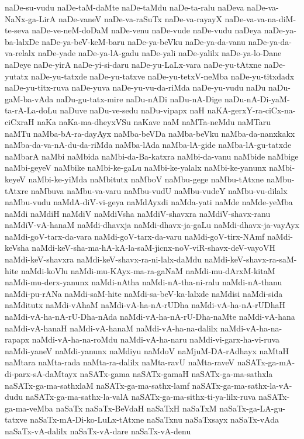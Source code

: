 {naDe-su-vudu
naDe-taM-daMte
naDe-taMdu
naDe-ta-ralu
naDeva
naDe-va-NaNx-ga-LirA
naDe-vaneV
naDe-va-raSuTx
naDe-va-rayayX
naDe-va-va-na-diM-te-seva
naDe-ve-neM-doDaM
naDe-venu
naDe-vude
naDe-vudu
naDeya
naDe-ya-ba-lalxDe
naDe-ya-beV-keM-baru
naDe-ya-beVku
naDe-ya-da-vanu
naDe-ya-da-va-relalx
naDe-yade
naDe-ya-lA-gadu
naDe-yali
naDe-yalilx
naDe-ya-lo-Dane
naDeye
naDe-yirA
naDe-yi-si-daru
naDe-yu-LaLx-vara
naDe-yu-tAtxne
naDe-yutatx
naDe-yu-tatxde
naDe-yu-tatxve
naDe-yu-tetxV-neMba
naDe-yu-titxdadx
naDe-yu-titx-ruva
naDe-yuva
naDe-yu-vu-da-riMda
naDe-yu-vudu
naDu
naDu-gaM-ba-vAda
naDu-gu-tatx-mire
naDu-nADi
naDu-nA-Dige
naDu-nA-Di-yaM-ta-rA-La-doLu
naDuve
naDu-ve-sedu
naDu-vipapx
naH
naKA-gerxY-ra-ciCx-na-ciCxraH
naKa
naKa-ma-dheyxVSu
naKave
naM
naMTa-neMdu
naMTaru
naMTu
naMba-bA-ra-dayAyx
naMba-beVDa
naMba-beVku
naMba-da-nanxkakx
naMba-da-va-nA-du-da-riMda
naMba-lAda
naMba-lA-gide
naMba-lA-gu-tatxde
naMbarA
naMbi
naMbida
naMbi-da-Ba-katxra
naMbi-da-vanu
naMbide
naMbige
naMbi-geyeV
naMbike
naMbi-ke-gaLu
naMbi-ke-yalalx
naMbi-ke-yanunx
naMbi-keyeV
naMbi-ke-yiMda
naMbitutx
naMboV
naMbu-gege
naMbu-tAtxne
naMbu-tAtxre
naMbuva
naMbu-va-varu
naMbu-vudU
naMbu-vudeY
naMbu-vu-dilalx
naMbu-vudu
naMdA-diV-vi-geya
naMdAyxdi
naMda-yati
naMde
naMde-yeMba
naMdi
naMdiH
naMdiV
naMdiVsha
naMdiV-shavxra
naMdiV-shavx-ranu
naMdiV-vA-hanaM
naMdi-dhavxja
naMdi-dhavx-ja-gaLu
naMdi-dhavx-ja-vayAyx
naMdi-goV-tarx-da-vara
naMdi-goV-tarx-da-varu
naMdi-goV-tirx-NAmf
naMdi-keVsha
naMdi-keV-sha-ma-hA-kA-la-saM-jicnx-noV-viR-shavx-deV-vayoVH
naMdi-keV-shavxra
naMdi-keV-shavx-ra-ni-lalx-daMdu
naMdi-keV-shavx-ra-saM-hite
naMdi-koVlu
naMdi-mu-KAyx-ma-ra-gaNaM
naMdi-mu-dArxM-kitaM
naMdi-mu-derx-yanunx
naMdi-nAtha
naMdi-nA-tha-ni-ralu
naMdi-nA-thanu
naMdi-pu-rANa
naMdi-saM-hite
naMdi-sa-beV-ka-lalxde
naMdisi
naMdi-sida
naMditutx
naMdi-vAhaM
naMdi-vA-ha-nA-rUDha
naMdi-vA-ha-nA-rUDhaH
naMdi-vA-ha-nA-rU-Dha-nAda
naMdi-vA-ha-nA-rU-Dha-naMte
naMdi-vA-hana
naMdi-vA-hanaH
naMdi-vA-hanaM
naMdi-vA-ha-na-dalilx
naMdi-vA-ha-na-rapapx
naMdi-vA-ha-na-roMdu
naMdi-vA-ha-naru
naMdi-vi-garx-ha-vi-ruva
naMdi-yaneV
naMdi-yanunx
naMdiyu
naMdoV
naMjuM-DA-rAdhayx
naMtaH
naMtara
naMta-rada
naMta-ra-dalilx
naMta-ravU
naMta-raveV
naSATx-ga-mA-di-parx-sA-daMtayx
naSATx-gama
naSATx-gamaH
naSATx-ga-ma-sathxla
naSATx-ga-ma-sathxlaM
naSATx-ga-ma-sathx-lamf
naSATx-ga-ma-sathx-la-vA-dudu
naSATx-ga-ma-sathx-la-valA
naSATx-ga-ma-sithx-ti-ya-lilx-ruva
naSATx-ga-ma-veMba
naSaTx
naSaTx-BeVdaH
naSaTxH
naSaTxM
naSaTx-ga-LA-gu-tatxve
naSaTx-mA-Di-ko-LuLx-tAtxne
naSaTxnu
naSaTxsayx
naSaTx-vAda
naSaTx-vA-dalilx
naSaTx-vA-dare
naSaTx-vA-denu
}
